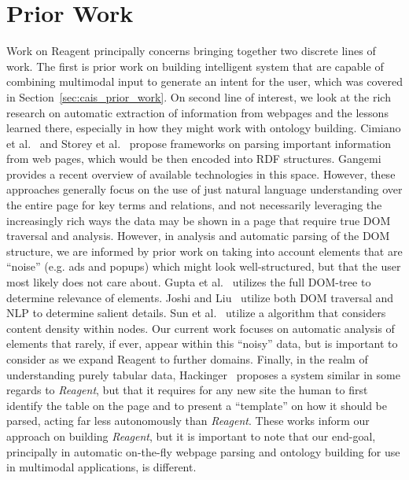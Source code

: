 \section{Prior Work}

Work on Reagent principally concerns bringing together two discrete lines
of work. The first is prior work on building intelligent system that are
capable of combining multimodal input to generate an intent for the user,
which was covered in Section~\ref{sec:cais_prior_work}. On second
line of interest, we look at the rich research on automatic extraction of
information from webpages and the lessons learned there, especially in how
they might work with ontology building. Cimiano et
al.~\cite{cimiano_towards_2004} and Storey et 
al.~\cite{storey_ontology_2005} propose frameworks on parsing
important information from web pages, which would be then encoded into RDF
structures. Gangemi~\cite{gangemi_comparison_2013} provides a recent
overview of available technologies in this space.
However, these approaches generally focus on the use of just natural
language understanding over the entire page for key terms and relations,
and not necessarily leveraging the increasingly rich ways the data may
be shown in a page that require true DOM traversal and analysis. However,
in analysis and automatic parsing of the DOM structure, we are informed
by prior work on taking into account elements that are ``noise'' (e.g.
ads and popups) which might look well-structured, but that the user most
likely does not care about. Gupta et al.~\cite{gupta_dom-based_2003}
utilizes the full DOM-tree to determine relevance of elements.
Joshi and Liu~\cite{joshi_web_2009} utilize both DOM traversal and NLP
to determine salient details. Sun et al.~\cite{sun_dom_2011} utilize a
algorithm that considers content density within nodes. Our current work
focuses on automatic analysis of elements that rarely, if ever, appear
within this ``noisy'' data, but is important to consider as we expand
Reagent to further domains. Finally, in the realm of understanding purely
tabular data, Hackinger~\cite{hackinger_datagorri:_2018} proposes a
system similar in some regards to \textit{Reagent}, but that it requires
for any new site the human to first identify the table on the page and
to present a ``template'' on how it should be parsed, acting far less
autonomously than \textit{Reagent}. These works inform our approach
on building \textit{Reagent}, but it is important to note that our
end-goal, principally in automatic on-the-fly webpage parsing and
ontology building for use in multimodal applications, is different.

